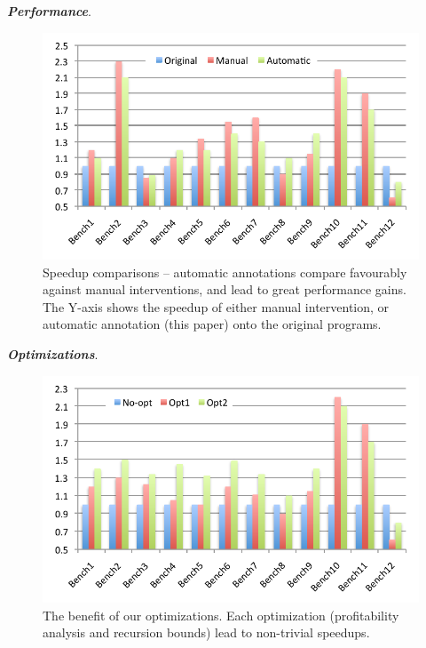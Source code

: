 \documentclass[sigplan,10pt,review,anonymous]{acmart}
\begin{document}
\textbf{\textit{Performance}}. 

\begin{figure}[t!]
\begin{center}
\includegraphics[width=0.9\columnwidth]{images/Absolute_speedups}
\caption{Speedup comparisons -- automatic annotations compare favourably against
manual interventions, and lead to great performance gains.
The Y-axis shows the speedup of either manual intervention, or automatic
annotation (this paper) onto the original programs.}
\label{fig:Absolute_speedups}
\end{center}
\end{figure}

\textbf{\textit{Optimizations}}.

\begin{figure}[t!]
\begin{center}
\includegraphics[width=0.9\columnwidth]{images/Opt_Speedups}
\caption{The benefit of our optimizations.
Each optimization (profitability analysis and recursion bounds) lead to
non-trivial speedups.}
\label{fig:Opt_Speedups}
\end{center}
\end{figure}
\end{document}
